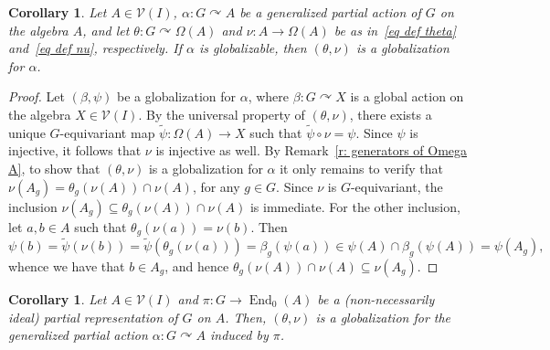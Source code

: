 \documentclass[11pt]{amsart}
\numberwithin{equation}{section}
\newtheorem{corollary}[theorem]{Corollary}
\theoremstyle{definition}
\theoremstyle{remark}
\begin{document}
\begin{corollary}\label{c: universal globalization}
    Let \( A \in \mathcal{V}(I) \), \(\alpha: G \curvearrowright A\) be a generalized partial action of \(G\) on the algebra \(A\), and let \(\theta: G \curvearrowright \Omega(A)\) and \(\nu: A \to \Omega(A)\) be as in~\eqref{eq def theta} and~\eqref{eq def nu}, respectively. If \(\alpha\) is globalizable, then \((\theta, \nu)\) is a globalization for \(\alpha\).
\end{corollary}

\begin{proof}
    Let \((\beta, \psi)\) be a globalization for \(\alpha\), where \(\beta: G \curvearrowright X\) is a global action on   the algebra \(X \in \mathcal{V}(I)\). By the universal property of \((\theta, \nu)\), there exists a unique \(G\)-equivariant map \(\widetilde{\psi}: \Omega(A) \to X\) such that \(\widetilde{\psi} \circ \nu = \psi\). Since \(\psi\) is injective, it follows that \(\nu\) is injective as well.
    By Remark~\ref{r: generators of Omega A}, to show that $(\theta,\nu)$ is a globalization for $\alpha$  it only remains to verify that \(\nu(A_g) = \theta_g(\nu(A)) \cap \nu(A)\), for any $g\in G$. Since $\nu$ is $G$-equivariant, the inclusion \(\nu(A_g)\subseteq \theta_g(\nu(A)) \cap \nu(A)\) is immediate. For the other inclusion, let \(a,b\in A\) such that \(\theta_g(\nu(a))=\nu(b)\).
    Then
    \[
        \psi(b)=\widetilde \psi(\nu(b))=\widetilde \psi(\theta_g(\nu(a)))=\beta_g(\psi(a))\in \psi(A)\cap \beta_g(\psi(A))=\psi(A_g),
    \]
  whence we have that $b\in A_g$, and hence \(\theta_g(\nu(A))\cap \nu(A)\subseteq \nu(A_g)\).
\end{proof}

\begin{corollary}\label{c: universal globalization 1}
    Let \( A \in \mathcal{V}(I) \) and \( \pi: G \to \operatorname{End}_0(A) \) be a  (non-necessarily ideal)  partial representation of \( G \) on \(A\). Then, \((\theta, \nu)\) is a globalization for the generalized partial action \(\alpha: G \curvearrowright A\) induced by \(\pi\).
\end{corollary}
\end{document}
